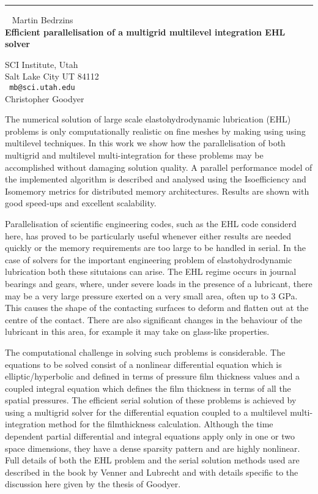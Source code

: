 \documentclass{report}
\begin{document}
\begin{center}

\rule{6in}{1pt} \
{\large
Martin Bedrzins
\\ {\bf
Efficient parallelisation of a multigrid multilevel integration EHL
solver
}}

SCI Institute, Utah
\\
Salt Lake City UT 84112
\\ {\tt
mb@sci.utah.edu
}
\\
Christopher Goodyer
\end{center}

The numerical solution of large scale elastohydrodynamic lubrication
(EHL) problems is only computationally realistic on fine meshes by
making using using multilevel techniques.  In this work we show how the
parallelisation of both multigrid and multilevel multi-integration for
these problems may be accomplished without damaging solution quality.
A parallel performance model of the implemented algorithm is described
and analysed using the Isoefficiency and Isomemory metrics for
distributed memory architectures.  Results are shown with good
speed-ups and excellent scalability.

Parallelisation of scientific engineering codes, such as the EHL code
considerd here, has proved to be particularly useful whenever either
results are needed quickly or the memory requirements are too large to
be handled in serial. In the case of solvers for the important
engineering problem of elastohydrodynamic lubrication both these
situtaions can arise. The EHL regime occurs in journal bearings and
gears, where, under severe loads in the presence of a lubricant, there
may be a very large pressure exerted on a very small area, often up to
3 GPa.  This causes the shape of the contacting surfaces to deform and
flatten out at the centre of the contact.  There are also significant
changes in the behaviour of the lubricant in this area, for example it
may take on glass-like properties.

The computational challenge in solving such problems is considerable.
The equations to be solved consist of a nonlinear differential equation
which is elliptic/hyperbolic and defined in terms of pressure film
thickness values and a coupled integral equation which defines the film
thickness in terms of all the spatial pressures.  The efficient serial
solution of these problems is achieved by using a multigrid solver for
the differential equation coupled to a multilevel multi-integration
method for the filmthickness calculation. Although the time dependent
partial differential and integral equations apply only in one or two
space dimensions, they have a dense sparsity pattern and are highly
nonlinear.  Full details of both the EHL problem and the serial
solution methods used are described in the book by Venner and Lubrecht
and with details specific to the discussion here given by the thesis of
Goodyer.
\end{document}
